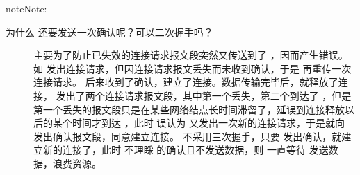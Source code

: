 \documentclass[letterpaper,10pt,english]{sphinxmanual}
\begin{document}
\begin{sphinxadmonition}{note}{Note:}\begin{description}
\item[{为什么  还要发送一次确认呢？可以二次握手吗？}] \leavevmode
主要为了防止已失效的连接请求报文段突然又传送到了  ，因而产生错误。如  发出连接请求，但因连接请求报文丢失而未收到确认，于是  再重传一次连接请求。
后来收到了确认，建立了连接。数据传输完毕后，就释放了连接，  发出了两个连接请求报文段，其中第一个丢失，第二个到达了  ，但是第一个丢失的报文段只是在某些网络结点长时间滞留了，延误到连接释放以后的某个时间才到达  ，此时  误认为  又发出一次新的连接请求，于是就向  发出确认报文段，同意建立连接。
不采用三次握手，只要  发出确认，就建立新的连接了，此时  不理睬  的确认且不发送数据，则  一直等待  发送数据，浪费资源。

\end{description}
\end{sphinxadmonition}
\end{document}
